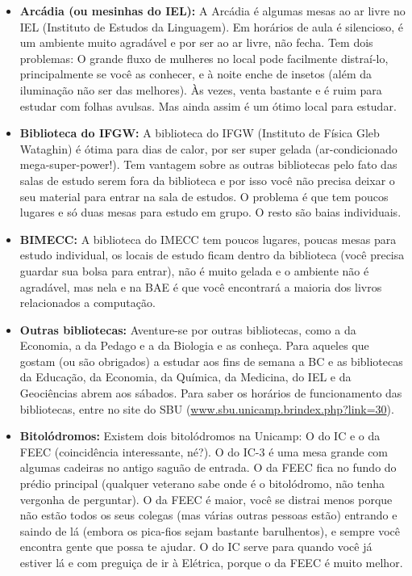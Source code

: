 \begin{itemize}
\item  \textbf{Arcádia (ou mesinhas do IEL):} A Arcádia é algumas mesas ao ar livre no IEL (Instituto de Estudos da Linguagem). Em horários de aula é silencioso, é um ambiente muito agradável e por ser ao ar livre, não fecha. Tem dois problemas: O grande fluxo de mulheres no local pode facilmente distraí-lo, principalmente se você as conhecer, e à noite enche de insetos (além da iluminação não ser das melhores). Às vezes, venta bastante e é ruim para estudar com folhas avulsas. Mas ainda assim é um ótimo local para estudar.
\end{itemize}

\begin{itemize}
\item  \textbf{Biblioteca do IFGW:} A biblioteca do IFGW (Instituto de Física Gleb Wataghin) é ótima para dias de calor, por ser super gelada (ar-condicionado mega-super-power!). Tem vantagem sobre as outras bibliotecas pelo fato das salas de estudo serem fora da biblioteca e por isso você não precisa deixar o seu material para entrar na sala de estudos. O problema é que tem poucos lugares e só duas mesas para estudo em grupo. O resto são baias individuais.
\end{itemize}

\begin{itemize}
\item  \textbf{BIMECC:} A biblioteca do IMECC tem poucos lugares, poucas mesas para estudo individual, os locais de estudo ficam dentro da biblioteca (você precisa guardar sua bolsa para entrar), não é muito gelada e o ambiente não é agradável, mas nela e na BAE é que você encontrará a maioria dos livros relacionados a computação.
\end{itemize}

\begin{itemize}
\item  \textbf{Outras bibliotecas:} Aventure-se por outras bibliotecas, como a da Economia, a da Pedago e a da Biologia e as conheça. Para aqueles que gostam (ou são obrigados) a estudar aos fins de semana a BC e as bibliotecas da Educação, da Economia, da Química, da Medicina, do IEL e da Geociências abrem aos sábados. Para saber os horários de funcionamento das bibliotecas, entre no site do SBU (\url{www.sbu.unicamp.brindex.php?link=30}).
\end{itemize}

\begin{itemize}
\item  \textbf{Bitolódromos:} Existem dois bitolódromos na Unicamp: O do IC e o da FEEC (coincidência interessante, né?). O do IC-3 é uma mesa grande com algumas cadeiras no antigo saguão de entrada. O da FEEC fica no fundo do prédio principal (qualquer veterano sabe onde é o bitolódromo, não tenha vergonha de perguntar). O da FEEC é maior, você se distrai menos porque não estão todos os seus colegas (mas várias outras pessoas estão) entrando e saindo de lá (embora os pica-fios sejam bastante barulhentos), e sempre você encontra gente que possa te ajudar. O do IC serve para quando você já estiver lá e com preguiça de ir à Elétrica, porque o da FEEC é muito melhor.
\end{itemize}

